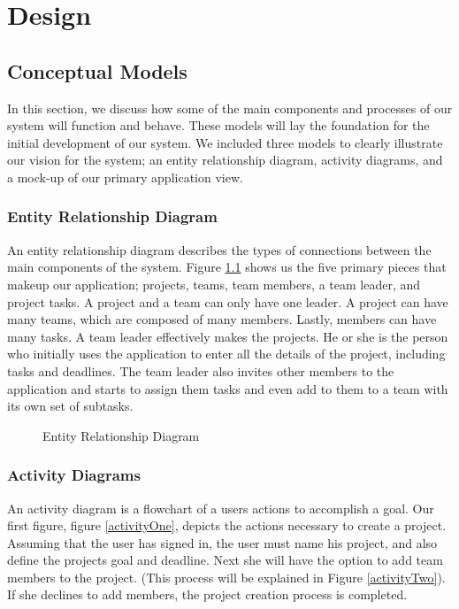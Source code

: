 \chapter{Design}

\section{Conceptual Models}
In this section, we discuss how some of the main components and processes of our system will function and behave. These models will lay the foundation for the initial development of our system. We included three models to clearly illustrate our vision for the system; an entity relationship diagram, activity diagrams, and a mock-up of our primary application view.
\subsection{Entity Relationship Diagram}
An entity relationship diagram describes the types of connections between the main components of the system. Figure \ref{erd} shows us the five primary pieces that makeup our application; projects, teams, team members, a team leader, and project tasks. A project and a team can only have one leader. A project can have many teams, which are composed of many members. Lastly, members can have many tasks. 
A team leader effectively makes the projects. He or she is the person who initially uses the application to enter all the details of the project, including tasks and deadlines. The team leader also invites other members to the application and starts to assign them tasks and even add to them to a team with its own set of subtasks. 
\begin{figure}[ht]
\centering
{}
\caption{Entity Relationship Diagram}
\label{erd}
\end{figure}
\FloatBarrier

\subsection{Activity Diagrams}
An activity diagram is a flowchart of a user\textsc{}s actions to accomplish a goal. Our first figure, figure \ref{activityOne}, depicts the actions necessary to create a project. Assuming that the user has signed in, the user must name his project, and also define the project\textsc{}s goal and deadline. Next she will have the option to add team members to the project. (This process will be explained in Figure \ref{activityTwo}).  If she declines to add members, the project creation process is completed. 

